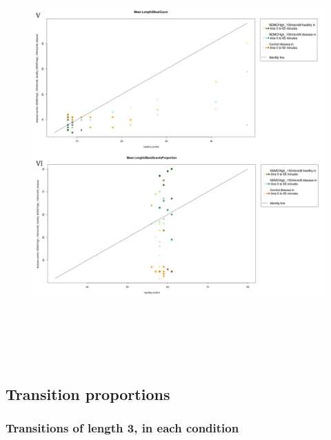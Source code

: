 \documentclass[a4paper,12pt]{article}
\begin{document}
\begin{figure}[h!]
\begin{center}
\includegraphics[width=15cm,height=16cm]{PTZCountScootsN.png}
\end{center}
\end{figure}


\newpage
\subsection{Transition proportions}
\subsubsection{Transitions of length 3, in each condition}
\end{document}
